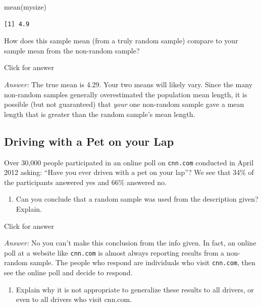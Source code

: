 \documentclass[
]{book}
\newenvironment{Shaded}{\begin{snugshade}}{\end{snugshade}}
\newcommand{\FunctionTok}[1]{\textcolor[rgb]{0.00,0.00,0.00}{#1}}
\newcommand{\NormalTok}[1]{#1}
\providecommand{\tightlist}{%
  \setlength{\itemsep}{0pt}\setlength{\parskip}{0pt}}
\begin{document}
\begin{Shaded}
\begin{Highlighting}[]
\FunctionTok{mean}\NormalTok{(mysize)}
\end{Highlighting}
\end{Shaded}

\begin{verbatim}
[1] 4.9
\end{verbatim}

How does this sample mean (from a truly random sample) compare to your sample mean from the non-random sample?

Click for answer

\emph{Answer:} The true mean is 4.29. Your two means will likely vary. Since the many non-random samples generally overestimated the population mean length, it is possible (but not guaranteed) that \emph{your} one non-random sample gave a mean length that is greater than the random sample's mean length.

\hypertarget{driving-with-a-pet-on-your-lap}{%
\subsection{Driving with a Pet on your Lap}\label{driving-with-a-pet-on-your-lap}}

Over 30,000 people participated in an online poll on \texttt{cnn.com} conducted in April 2012 asking: ``Have you ever driven with a pet on your lap''? We see that 34\% of the participants answered yes and 66\% answered no.

\begin{enumerate}
\def\labelenumi{\alph{enumi}.}
\tightlist
\item
  Can you conclude that a random sample was used from the description given? Explain.
\end{enumerate}

Click for answer

\emph{Answer:} No you can't make this conclusion from the info given. In fact, an online poll at a website like \texttt{cnn.com} is almost always reporting results from a non-random sample. The people who respond are individuals who visit \texttt{cnn.com}, then see the online poll and decide to respond.

\begin{enumerate}
\def\labelenumi{\alph{enumi}.}
\setcounter{enumi}{1}
\tightlist
\item
  Explain why it is not appropriate to generalize these results to all drivers, or even to all drivers who visit cnn.com.
\end{enumerate}
\end{document}
